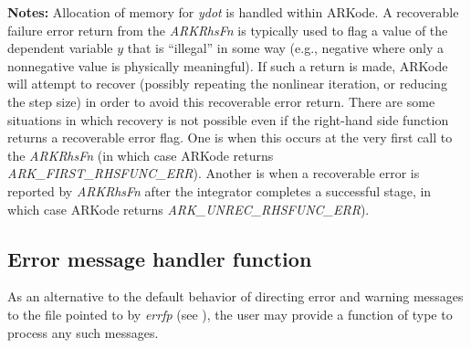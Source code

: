 \documentclass[letterpaper,10pt,english]{sphinxmanual}
\begin{document}
\begin{fulllineitems}
\textbf{Notes:} Allocation of memory for \emph{ydot} is handled within
ARKode.  A recoverable failure error return from the \emph{ARKRhsFn} is
typically used to flag a value of the dependent variable \(y\)
that is ``illegal'' in some way (e.g., negative where only a
nonnegative value is physically meaningful).  If such a return is
made, ARKode will attempt to recover (possibly repeating the
nonlinear iteration, or reducing the step size) in order to avoid
this recoverable error return.  There are some situations in which
recovery is not possible even if the right-hand side function
returns a recoverable error flag.  One is when this occurs at the
very first call to the \emph{ARKRhsFn} (in which case
ARKode returns \emph{ARK\_FIRST\_RHSFUNC\_ERR}).  Another is when a
recoverable error is reported by \emph{ARKRhsFn} after the integrator
completes a successful stage, in which case ARKode returns
\emph{ARK\_UNREC\_RHSFUNC\_ERR}).

\end{fulllineitems}



\subsection{Error message handler function}
\label{c_interface/User_supplied:cinterface-errorhandler}\label{c_interface/User_supplied:error-message-handler-function}
As an alternative to the default behavior of directing error and
warning messages to the file pointed to by \emph{errfp} (see
{\hyperref[c_interface/User_callable:c.ARKodeSetErrFile]{\emph{}}}), the user may provide a function of type
{\hyperref[c_interface/User_supplied:c.ARKErrHandlerFn]{\emph{}}} to process any such messages.
\end{document}
